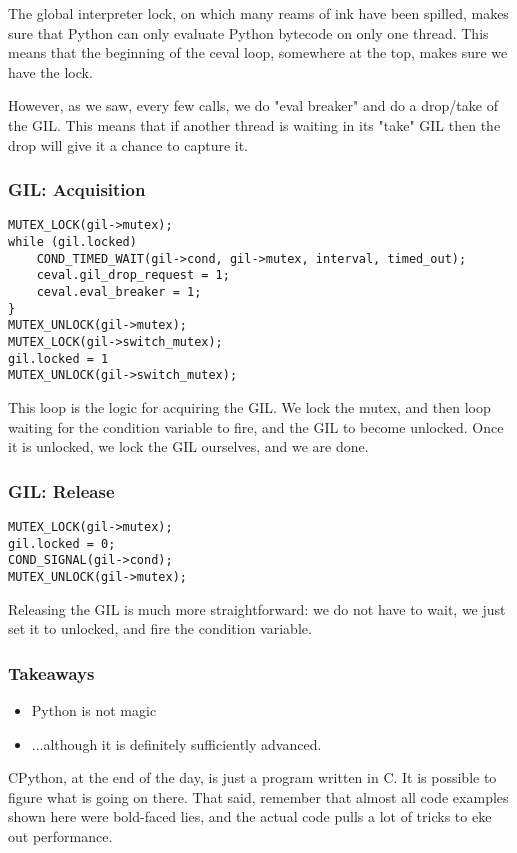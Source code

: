 The global interpreter lock,
on which many reams of ink have been spilled,
makes sure that Python can only evaluate Python bytecode
on only one thread.
This means that the beginning of the ceval loop,
somewhere at the top,
makes sure we have the lock.

However,
as we saw,
every few calls,
we do "eval breaker"
and do a drop/take of the GIL.
This means that if another thread is waiting in its
"take"
GIL then the drop will give it a chance to capture it.

\begin{frame}
\frametitle{GIL: Acquisition}
\begin{lstlisting}
MUTEX_LOCK(gil->mutex);
while (gil.locked)
    COND_TIMED_WAIT(gil->cond, gil->mutex, interval, timed_out);
    ceval.gil_drop_request = 1;
    ceval.eval_breaker = 1;
}
MUTEX_UNLOCK(gil->mutex);
MUTEX_LOCK(gil->switch_mutex);
gil.locked = 1
MUTEX_UNLOCK(gil->switch_mutex);
\end{lstlisting}
\end{frame}

This loop is the logic for acquiring the GIL.
We lock the mutex,
and then loop waiting for the condition variable to fire,
and the GIL to become unlocked.
Once it is unlocked,
we lock the GIL ourselves,
and we are done.


\begin{frame}
\frametitle{GIL: Release}
\begin{lstlisting}
MUTEX_LOCK(gil->mutex);
gil.locked = 0;
COND_SIGNAL(gil->cond);
MUTEX_UNLOCK(gil->mutex);
\end{lstlisting}
\end{frame}

Releasing the GIL is much more straightforward:
we do not have to wait,
we just set it to unlocked,
and fire the condition variable.

\begin{frame}
\frametitle{Takeaways}

\begin{itemize}
\item Python is not magic\pause
\item ...although it is definitely sufficiently advanced.
\end{itemize}
\end{frame}

CPython,
at the end of the day,
is just a program written in C.
It is possible to figure what is going on there.
That said,
remember that almost all code examples shown here were
bold-faced lies,
and the actual code pulls a lot of tricks to eke out performance.


